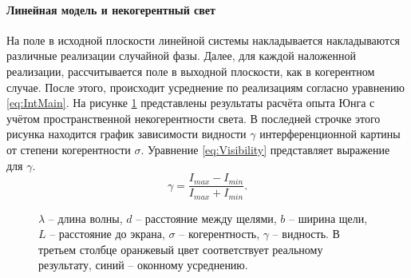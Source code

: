 \paragraph{Линейная модель и некогерентный свет}
На поле в исходной плоскости линейной системы накладывается накладываются различные реализации случайной фазы. Далее, для каждой наложенной реализации, рассчитывается поле в выходной плоскости, как в когерентном случае. После этого, происходит усреднение по реализациям согласно уравнению \ref{eq:IntMain}. На рисунке \ref{ris:YungExperiment} представлены результаты расчёта опыта Юнга с учётом пространственной некогерентности света. В последней строчке этого рисунка находится график зависимости видности $\gamma$ интерференционной картины от степени когерентности $\sigma$. Уравнение \ref{eq:Visibility} представляет выражение для $\gamma$.
\begin{equation}\label{eq:Visibility}
	\gamma = \frac{I_{max}-I_{min}}{I_{max}+I_{min}}.
\end{equation}
\begin{figure}[h]
	\caption{$\lambda$ -- длина волны, $d$ -- расстояние между щелями, $b$ -- ширина щели, $L$ -- расстояние до экрана, $\sigma$ -- когерентность, $\gamma$ -- видность. В третьем столбце оранжевый цвет соответствует реальному результату, синий -- оконному усреднению.}
	\label{ris:YungExperiment}
\end{figure}

